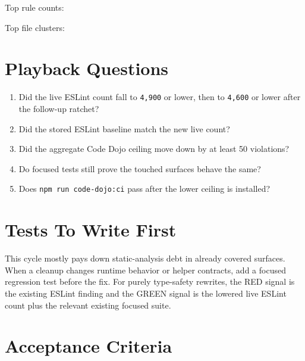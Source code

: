 Top rule counts:



Top file clusters:



\section{Playback Questions}\label{record-216-playback-questions}

\begin{enumerate}
\def\labelenumi{\arabic{enumi}.}
\tightlist
\item
  Did the live ESLint count fall to \texttt{4\allowbreak{},\allowbreak{}9\allowbreak{}0\allowbreak{}0} or lower, then to \texttt{4\allowbreak{},\allowbreak{}6\allowbreak{}0\allowbreak{}0} or lower after the follow-up ratchet?
\item
  Did the stored ESLint baseline match the new live count?
\item
  Did the aggregate Code Dojo ceiling move down by at least 50 violations?
\item
  Do focused tests still prove the touched surfaces behave the same?
\item
  Does \texttt{n\allowbreak{}p\allowbreak{}m\allowbreak{} \allowbreak{}r\allowbreak{}u\allowbreak{}n\allowbreak{} \allowbreak{}c\allowbreak{}o\allowbreak{}d\allowbreak{}e\allowbreak{}-\allowbreak{}d\allowbreak{}o\allowbreak{}j\allowbreak{}o\allowbreak{}:\allowbreak{}c\allowbreak{}i} pass after the lower ceiling is installed?
\end{enumerate}

\section{Tests To Write First}\label{record-216-tests-to-write-first}

This cycle mostly pays down static-analysis debt in already covered surfaces. When a cleanup changes runtime behavior or helper contracts, add a focused regression test before the fix. For purely type-safety rewrites, the RED signal is the existing ESLint finding and the GREEN signal is the lowered live ESLint count plus the relevant existing focused suite.

\section{Acceptance Criteria}\label{record-216-acceptance-criteria}

